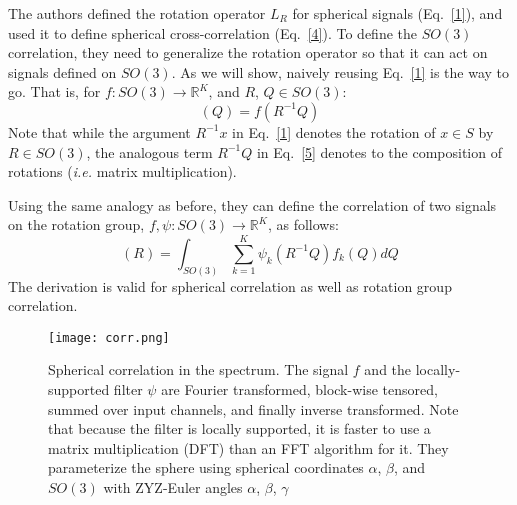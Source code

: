 \documentclass[10pt,twocolumn,letterpaper]{article}
\begin{document}
\par The authors defined the rotation operator $L_R$ for spherical signals (Eq.~\ref{1}), and used it to define spherical cross-correlation (Eq.~\ref{4}). To define the $SO(3)$ correlation, they need to generalize the rotation operator so that it can act on signals defined on $SO(3)$. As we will show, naively reusing Eq.~\ref{1} is the way to go. That is, for $f: SO(3)\to\mathbb{R}^K$, and $R$, $Q\in{SO(3)}$:
\begin{equation}
[L_R{f}](Q)=f(R^{-1}Q)
\end{equation}\label{5}
Note that while the argument $R^{-1}x$ in Eq.~\ref{1} denotes the rotation of $x\in{S}$ by $R\in{SO(3)}$, the analogous term $R^{−1}Q$ in Eq.~\ref{5} denotes to the composition of rotations (\emph{i.e.} matrix multiplication).
\par Using the same analogy as before, they can define the correlation of
two signals on the rotation group, $f,\psi:SO(3)\to\mathbb{R}^K$, as follows:
\begin{equation}
[\psi\star{f}](R)=\int_{SO(3)}\sum_{k=1}^{K}\psi_k(R^{-1}Q)f_{k}(Q)dQ
\end{equation}
The derivation is valid for spherical correlation as well as rotation group correlation.
   \begin{figure}[!htb]
 \centering
 \texttt{[image: corr.png]}\\
 \caption{Spherical correlation in the spectrum. The signal $f$ and the locally-supported filter $\psi$ are Fourier transformed, block-wise tensored, summed over input channels, and finally inverse transformed. Note that because the filter is locally supported, it is faster to use a matrix multiplication (DFT) than an FFT algorithm for it. They parameterize the sphere using spherical coordinates $\alpha$, $\beta$,
and $SO(3)$ with ZYZ-Euler angles $\alpha$, $\beta$, $\gamma$}\label{Figure1}
 \end{figure}
\end{document}
